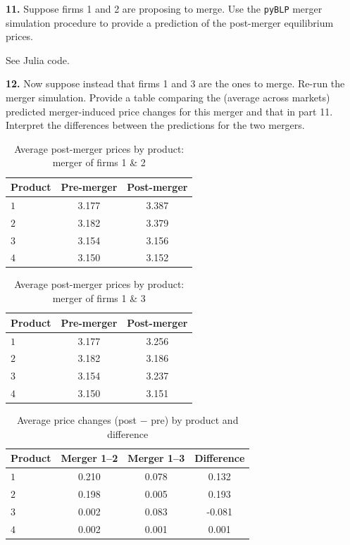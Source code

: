 \documentclass{article}
\begin{document}
\begin{tcolorbox}
\textbf{11.} Suppose firms 1 and 2 are proposing to merge. Use the \texttt{pyBLP}
merger simulation procedure to provide a prediction of the post-merger
equilibrium prices.
\end{tcolorbox}

See Julia code.

\begin{tcolorbox}
\textbf{12.} Now suppose instead that firms 1 and 3 are the ones to merge.
Re-run the merger simulation. Provide a table comparing the (average
across markets) predicted merger-induced price changes for this merger and
that in part 11. Interpret the differences between the predictions for the
two mergers.
\end{tcolorbox}

\begin{table}[H]
\centering
\caption{Average post-merger prices by product: merger of firms 1 \& 2}
\begin{tabular}{lcc}
\hline Product & Pre-merger & Post-merger \\ \hline
$1$ & 3.177 & 3.387 \\
$2$ & 3.182 & 3.379 \\
$3$ & 3.154 & 3.156 \\
$4$ & 3.150 & 3.152 \\
\hline\end{tabular}\end{table}

\begin{table}[H]
\centering
\caption{Average post-merger prices by product: merger of firms 1 \& 3}
\begin{tabular}{lcc}
\hline Product & Pre-merger & Post-merger \\ \hline
$1$ & 3.177 & 3.256 \\
$2$ & 3.182 & 3.186 \\
$3$ & 3.154 & 3.237 \\
$4$ & 3.150 & 3.151 \\
\hline\end{tabular}\end{table}

\begin{table}[H]
\centering
\caption{Average price changes (post $-$ pre) by product and difference}
\begin{tabular}{lccc}
\hline Product & Merger 1--2 & Merger 1--3 & Difference \\ \hline
$1$ & 0.210 & 0.078 & 0.132 \\
$2$ & 0.198 & 0.005 & 0.193 \\
$3$ & 0.002 & 0.083 & -0.081 \\
$4$ & 0.002 & 0.001 & 0.001 \\
\hline\end{tabular}\end{table}
\end{document}
